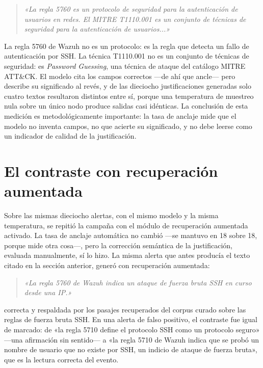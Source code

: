 \begin{quote}
\itshape
«La regla 5760 es un protocolo de seguridad para la autenticación de usuarios en redes. El MITRE
T1110.001 es un conjunto de técnicas de seguridad para la autenticación de usuarios...»
\end{quote}

La regla 5760 de Wazuh no es un protocolo: es la regla que detecta un fallo de autenticación por
SSH. La técnica T1110.001 no es un conjunto de técnicas de seguridad: es \emph{Password Guessing},
una técnica de ataque del catálogo MITRE ATT\&CK. El modelo cita los campos correctos ---de ahí que
ancle--- pero describe su significado al revés, y de las dieciocho justificaciones generadas solo
cuatro textos resultaron distintos entre sí, porque una temperatura de muestreo nula sobre un único
nodo produce salidas casi idénticas. La conclusión de esta medición es metodológicamente
importante: la tasa de anclaje mide que el modelo no inventa campos, no que acierte su significado,
y no debe leerse como un indicador de calidad de la justificación.

\section{El contraste con recuperación aumentada}

Sobre las mismas dieciocho alertas, con el mismo modelo y la misma temperatura, se repitió la
campaña con el módulo de recuperación aumentada activado. La tasa de anclaje automática no cambió
---se mantuvo en 18 sobre 18, porque mide otra cosa---, pero la corrección semántica de la
justificación, evaluada manualmente, sí lo hizo. La misma alerta que antes producía el texto citado
en la sección anterior, generó con recuperación aumentada:

\begin{quote}
\itshape
«La regla 5760 de Wazuh indica un ataque de fuerza bruta SSH en curso desde una IP.»
\end{quote}

correcta y respaldada por los pasajes recuperados del corpus curado sobre las reglas de fuerza
bruta SSH. En una alerta de falso positivo, el contraste fue igual de marcado: de «la regla 5710
define el protocolo SSH como un protocolo seguro» ---una afirmación sin sentido--- a «la regla 5710
de Wazuh indica que se probó un nombre de usuario que no existe por SSH, un indicio de ataque de
fuerza bruta», que es la lectura correcta del evento.

